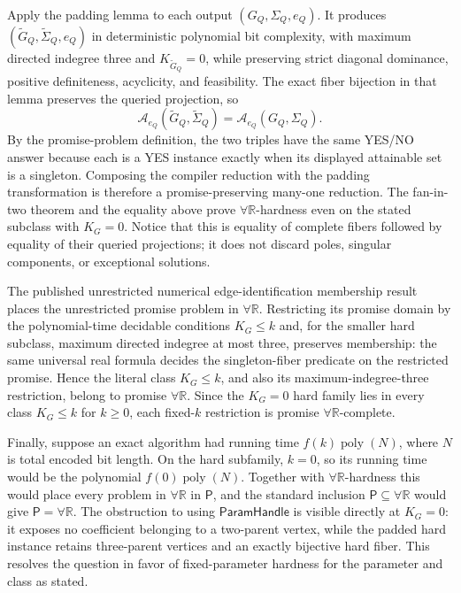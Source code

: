 Apply the padding lemma to each output \((G_Q,\Sigma_Q,e_Q)\).  It produces \((\widetilde G_Q,\widetilde\Sigma_Q,e_Q)\) in deterministic polynomial bit complexity, with maximum directed indegree three and \(K_{\widetilde G_Q}=0\), while preserving strict diagonal dominance, positive definiteness, acyclicity, and feasibility.  The exact fiber bijection in that lemma preserves the queried projection, so
\[
\mathcal A_{e_Q}(\widetilde G_Q,\widetilde\Sigma_Q)
=\mathcal A_{e_Q}(G_Q,\Sigma_Q).
\]
By the promise-problem definition, the two triples have the same YES/NO answer because each is a YES instance exactly when its displayed attainable set is a singleton.  Composing the compiler reduction with the padding transformation is therefore a promise-preserving many-one reduction.  The fan-in-two theorem and the equality above prove \(\forall\mathbb R\)-hardness even on the stated subclass with \(K_G=0\).  Notice that this is equality of complete fibers followed by equality of their queried projections; it does not discard poles, singular components, or exceptional solutions.

The published unrestricted numerical edge-identification membership result places the unrestricted promise problem in \(\forall\mathbb R\).  Restricting its promise domain by the polynomial-time decidable conditions \(K_G\le k\) and, for the smaller hard subclass, maximum directed indegree at most three, preserves membership: the same universal real formula decides the singleton-fiber predicate on the restricted promise.  Hence the literal class \(K_G\le k\), and also its maximum-indegree-three restriction, belong to promise \(\forall\mathbb R\).  Since the \(K_G=0\) hard family lies in every class \(K_G\le k\) for \(k\ge0\), each fixed-\(k\) restriction is promise \(\forall\mathbb R\)-complete.

Finally, suppose an exact algorithm had running time \(f(k)\operatorname{poly}(N)\), where \(N\) is total encoded bit length.  On the hard subfamily, \(k=0\), so its running time would be the polynomial \(f(0)\operatorname{poly}(N)\).  Together with \(\forall\mathbb R\)-hardness this would place every problem in \(\forall\mathbb R\) in \(\mathsf P\), and the standard inclusion \(\mathsf P\subseteq\forall\mathbb R\) would give \(\mathsf P=\forall\mathbb R\).  The obstruction to using \(\mathsf{ParamHandle}\) is visible directly at \(K_G=0\): it exposes no coefficient belonging to a two-parent vertex, while the padded hard instance retains three-parent vertices and an exactly bijective hard fiber.  This resolves the question in favor of fixed-parameter hardness for the parameter and class as stated.
